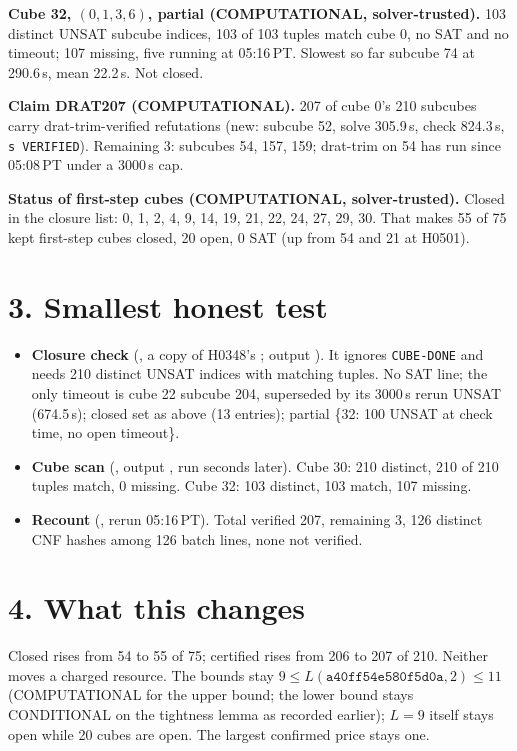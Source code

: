 \documentclass[11pt]{article}
\begin{document}
\textbf{Cube 32, $(0,1,3,6)$, partial (COMPUTATIONAL, solver-trusted).} 103 distinct UNSAT subcube indices, 103 of 103 tuples match cube 0, no SAT and no timeout; 107 missing, five running at 05:16\,PT. Slowest so far subcube 74 at 290.6\,s, mean 22.2\,s. Not closed.

\textbf{Claim DRAT207 (COMPUTATIONAL).} 207 of cube 0's 210 subcubes carry drat-trim-verified refutations (new: subcube 52, solve 305.9\,s, check 824.3\,s, \texttt{s VERIFIED}). Remaining 3: subcubes 54, 157, 159; drat-trim on 54 has run since 05:08\,PT under a 3000\,s cap.

\textbf{Status of first-step cubes (COMPUTATIONAL, solver-trusted).} Closed in the closure list: 0, 1, 2, 4, 9, 14, 19, 21, 22, 24, 27, 29, 30. That makes 55 of 75 kept first-step cubes closed, 20 open, 0 SAT (up from 54 and 21 at H0501).

\section*{3. Smallest honest test}
\begin{itemize}
\item \textbf{Closure check} (, a copy of H0348's ; output ). It ignores \texttt{CUBE-DONE} and needs 210 distinct UNSAT indices with matching tuples. No SAT line; the only timeout is cube 22 subcube 204, superseded by its 3000\,s rerun UNSAT (674.5\,s); closed set as above (13 entries); partial \{32: 100 UNSAT at check time, no open timeout\}.
\item \textbf{Cube scan} (, output , run seconds later). Cube 30: 210 distinct, 210 of 210 tuples match, 0 missing. Cube 32: 103 distinct, 103 match, 107 missing.
\item \textbf{Recount} (, rerun 05:16\,PT). Total verified 207, remaining 3, 126 distinct CNF hashes among 126 batch lines, none not verified.
\end{itemize}

\section*{4. What this changes}
Closed rises from 54 to 55 of 75; certified rises from 206 to 207 of 210. Neither moves a charged resource. The bounds stay $9\le L(\texttt{a40ff54e580f5d0a},2)\le 11$ (COMPUTATIONAL for the upper bound; the lower bound stays CONDITIONAL on the tightness lemma as recorded earlier); $L=9$ itself stays open while 20 cubes are open. The largest confirmed price stays one.
\end{document}
